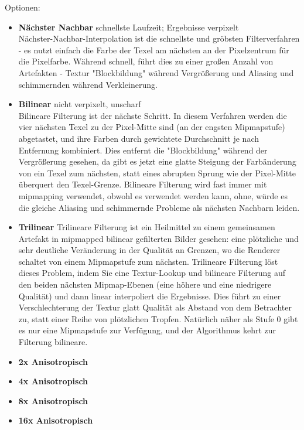 \documentclass[10pt]{scrreprt}
\begin{document}
Optionen:
\begin{itemize}
\item \textbf{Nächster Nachbar} schnellste Laufzeit; Ergebnisse verpixelt\\
Nächster-Nachbar-Interpolation ist die schnellste und gröbsten Filterverfahren - es nutzt einfach die Farbe der Texel am nächsten an der Pixelzentrum für die Pixelfarbe. Während schnell, führt dies zu einer großen Anzahl von Artefakten - Textur "Blockbildung" während Vergrößerung und Aliasing und schimmernden während Verkleinerung.

\item \textbf{Bilinear} nicht verpixelt, unscharf\\
Bilineare Filterung ist der nächste Schritt. In diesem Verfahren werden die vier nächsten Texel zu der Pixel-Mitte sind (an der engsten Mipmapstufe) abgetastet, und ihre Farben durch gewichtete Durchschnitt je nach Entfernung kombiniert. Dies entfernt die "Blockbildung" während der Vergrößerung gesehen, da gibt es jetzt eine glatte Steigung der Farbänderung von ein Texel zum nächsten, statt eines abrupten Sprung wie der Pixel-Mitte überquert den Texel-Grenze. Bilineare Filterung wird fast immer mit mipmapping verwendet, obwohl es verwendet werden kann, ohne, würde es die gleiche Aliasing und schimmernde Probleme als nächsten Nachbarn leiden.

\item \textbf{Trilinear} %
Trilineare Filterung ist ein Heilmittel zu einem gemeinsamen Artefakt in mipmapped bilinear gefilterten Bilder gesehen: eine plötzliche und sehr deutliche Veränderung in der Qualität an Grenzen, wo die Renderer schaltet von einem Mipmapstufe zum nächsten. Trilineare Filterung löst dieses Problem, indem Sie eine Textur-Lookup und bilineare Filterung auf den beiden nächsten Mipmap-Ebenen (eine höhere und eine niedrigere Qualität) und dann linear interpoliert die Ergebnisse. Dies führt zu einer Verschlechterung der Textur glatt Qualität als Abstand von dem Betrachter zu, statt einer Reihe von plötzlichen Tropfen. Natürlich näher als Stufe 0 gibt es nur eine Mipmapstufe zur Verfügung, und der Algorithmus kehrt zur Filterung bilineare.

\item \textbf{2x Anisotropisch}
\item \textbf{4x Anisotropisch}
\item \textbf{8x Anisotropisch}
\item \textbf{16x Anisotropisch}
\end{itemize}
\end{document}
